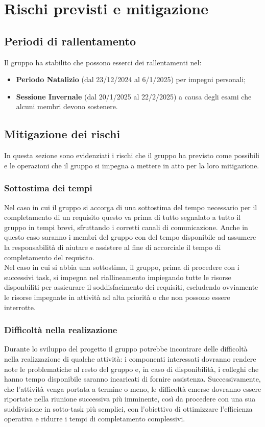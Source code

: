 \section{Rischi previsti e mitigazione}
\subsection{Periodi di rallentamento}
Il gruppo ha stabilito che possono esserci dei rallentamenti nel:
\begin{itemize}
    \item \textbf{Periodo Natalizio} (dal 23/12/2024 al 6/1/2025) per impegni personali;
    \item \textbf{Sessione Invernale} (dal 20/1/2025 al 22/2/2025) a causa degli esami che alcuni membri devono sostenere.
\end{itemize}
\subsection{Mitigazione dei rischi}
In questa sezione sono evidenziati i rischi che il gruppo ha previsto come possibili e le operazioni che il gruppo si impegna a mettere in atto per la loro mitigazione.

\subsubsection{Sottostima dei tempi}
Nel caso in cui il gruppo si accorga di una sottostima del tempo necessario per il completamento di un requisito questo va prima di tutto segnalato a tutto il gruppo in tempi brevi, sfruttando i corretti canali di comunicazione. Anche in questo caso saranno i membri del gruppo con del tempo disponibile ad assumere la responsabilità di aiutare e assistere al fine di accorciale il tempo di completamento del requisito.
\\
Nel caso in cui si abbia una sottostima, il gruppo, prima di procedere con i successivi task, si impegna nel riallineamento impiegando tutte le risorse disponbiliti per assicurare il soddisfacimento dei requisiti, escludendo ovviamente le risorse impegnate in attività ad alta priorità o che non possono essere interrotte.


\subsubsection{Difficoltà nella realizazione}
Durante lo sviluppo del progetto il gruppo potrebbe incontrare delle difficoltà nella realizzazione di qualche attività: i componenti interessati dovranno rendere note le problematiche al resto del gruppo e, in caso di disponibilità, i colleghi che hanno tempo disponibile saranno incaricati di fornire assistenza.
Successivamente, che l’attività venga portata a termine o meno, le difficoltà emerse dovranno essere riportate nella riunione successiva più imminente, così da procedere con una sua suddivisione in sotto-task più semplici, con l'obiettivo di ottimizzare l’efficienza operativa e ridurre i tempi di completamento complessivi.


